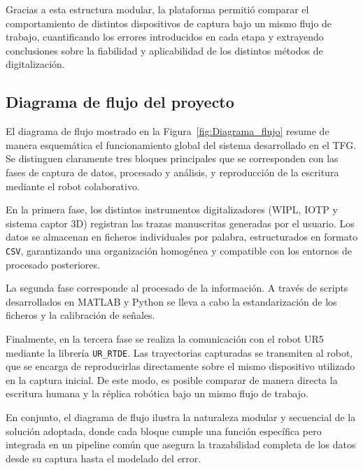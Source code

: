 \documentclass[12pt,a4paper,oneside]{report}
\begin{document}
Gracias a esta estructura modular, la plataforma permitió 
comparar el comportamiento de distintos dispositivos de captura 
bajo un mismo flujo de trabajo, cuantificando los errores 
introducidos en cada etapa y extrayendo conclusiones sobre la 
fiabilidad y aplicabilidad de los distintos métodos de 
digitalización.

\subsection{Diagrama de flujo del proyecto}

El diagrama de flujo mostrado en la Figura~\ref{fig:Diagrama_flujo} 
resume de manera esquemática el funcionamiento global del sistema 
desarrollado en el TFG. Se distinguen claramente tres bloques 
principales que se corresponden con las fases de captura de datos, 
procesado y análisis, y reproducción de la escritura mediante el 
robot colaborativo.

En la primera fase, los distintos instrumentos digitalizadores 
(\acrshort{WIPL}, \acrshort{IOTP} y sistema captor 3D) registran 
las trazas manuscritas generadas por el usuario. Los datos se 
almacenan en ficheros individuales por palabra, estructurados en 
formato \texttt{CSV}, garantizando una organización homogénea y 
compatible con los entornos de procesado posteriores.

La segunda fase corresponde al procesado de la información. A 
través de scripts desarrollados en MATLAB y Python se lleva a cabo 
la estandarización de los ficheros y la calibración de señales. 


Finalmente, en la tercera fase se realiza la comunicación con el 
robot \acrshort{UR5} mediante la librería \texttt{UR\_RTDE}. Las 
trayectorias capturadas se transmiten al robot, que se encarga de 
reproducirlas directamente sobre el mismo dispositivo utilizado en 
la captura inicial. De este modo, es posible comparar de manera 
directa la escritura humana y la réplica robótica bajo un mismo 
flujo de trabajo.

En conjunto, el diagrama de flujo ilustra la naturaleza modular y 
secuencial de la solución adoptada, donde cada bloque cumple una 
función específica pero integrada en un pipeline común que asegura 
la trazabilidad completa de los datos desde su captura hasta el 
modelado del error.
\end{document}
